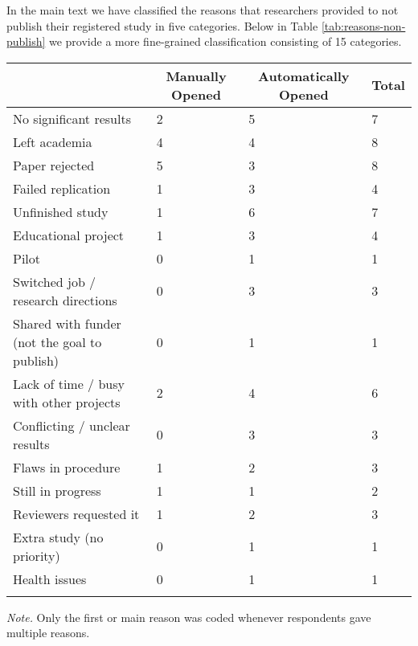 \documentclass[
  ,jou, a4paper,floatsintext]{apa6}
\begin{document}
In the main text we have classified the reasons that researchers provided to not publish their registered study in five categories. Below in Table \ref{tab:reasons-non-publish} we provide a more fine-grained classification consisting of 15 categories.

\begin{table*}[tbp]

\begin{center}
\begin{threeparttable}

\caption{\label{tab:reasons-non-publish}Summary of main reasons researchers self-reported to not publish registered studies.}

\begin{tabular}{llll}
\toprule
 & \multicolumn{1}{c}{Manually Opened} & \multicolumn{1}{c}{Automatically Opened} & \multicolumn{1}{c}{Total}\\
\midrule
No significant results & 2 & 5 & 7\\
Left academia & 4 & 4 & 8\\
Paper rejected & 5 & 3 & 8\\
Failed replication & 1 & 3 & 4\\
Unfinished study & 1 & 6 & 7\\
Educational project & 1 & 3 & 4\\
Pilot & 0 & 1 & 1\\
Switched job / research directions & 0 & 3 & 3\\
Shared with funder (not the goal to publish) & 0 & 1 & 1\\
Lack of time / busy with other projects & 2 & 4 & 6\\
Conflicting / unclear results & 0 & 3 & 3\\
Flaws in procedure & 1 & 2 & 3\\
Still in progress & 1 & 1 & 2\\
Reviewers requested it & 1 & 2 & 3\\
Extra study (no priority) & 0 & 1 & 1\\
Health issues & 0 & 1 & 1\\
\bottomrule
\addlinespace
\end{tabular}

\begin{tablenotes}[para]
\normalsize{\textit{Note.} Only the first or main reason was coded whenever respondents gave multiple reasons.}
\end{tablenotes}

\end{threeparttable}
\end{center}

\end{table*}
\end{document}
